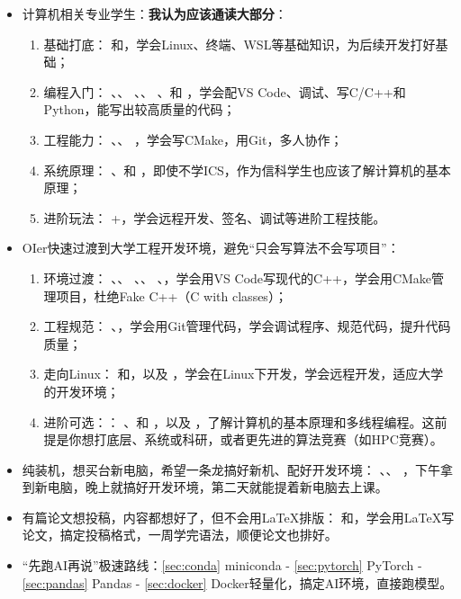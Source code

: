 \begin{itemize}
\begin{enumerate}
  \end{enumerate}
  \item 计算机相关专业学生：\textbf{我认为应该通读大部分}：
  \begin{enumerate}
    \item 基础打底：  和，学会Linux、终端、WSL等基础知识，为后续开发打好基础；
    \item 编程入门：  、、  、、  、和
    ，学会配VS Code、调试、写C/C++和Python，能写出较高质量的代码；
    \item 工程能力：  、、  ，学会写CMake，用Git，多人协作；
    \item 系统原理：  、和  ，即使不学ICS，作为信科学生也应该了解计算机的基本原理；
    \item 进阶玩法：  +，学会远程开发、签名、调试等进阶工程技能。
  \end{enumerate}
  \item OIer快速过渡到大学工程开发环境，避免“只会写算法不会写项目”：
  \begin{enumerate}
    \item 环境过渡：  、、  、、  、，学会用VS Code写现代的C++，学会用CMake管理项目，杜绝Fake C++（C with classes）；
    \item 工程规范：  、，学会用Git管理代码，学会调试程序、规范代码，提升代码质量；
    \item 走向Linux：  和，以及  ，学会在Linux下开发，学会远程开发，适应大学的开发环境；
    \item 进阶可选：：  、和  ，以及  ，了解计算机的基本原理和多线程编程。这前提是你想打底层、系统或科研，或者更先进的算法竞赛（如HPC竞赛）。
  \end{enumerate}
  \item 纯装机，想买台新电脑，希望一条龙搞好新机、配好开发环境：  、、  ，下午拿到新电脑，晚上就搞好开发环境，第二天就能提着新电脑去上课。
  \item 有篇论文想投稿，内容都想好了，但不会用LaTeX排版：  和，学会用LaTeX写论文，搞定投稿格式，一周学完语法，顺便论文也排好。
  \item “先跑AI再说”极速路线：\ref{sec:conda} miniconda - \ref{sec:pytorch} PyTorch - \ref{sec:pandas} Pandas - \ref{sec:docker} Docker轻量化，搞定AI环境，直接跑模型。
\end{itemize}

